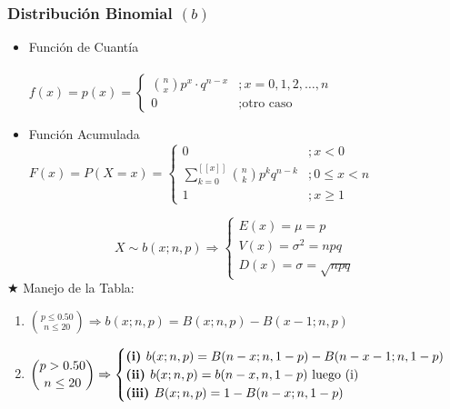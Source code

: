 \documentclass[10pt,letterpaper]{article}
\begin{document}
\subsubsection{Distribución Binomial $(b)$}
\begin{multicols}{2}
\begin{itemize}
\item Función de Cuantía \\ \vspace{0.025cm} \\
$f(x)=p(x)=
\begin{cases}
\binom{n}{x} p^x \cdot q^{n-x} &; x=0,1,2,\ldots ,n \\
0 &; \text{otro caso}
\end{cases}$
\end{itemize}
\columnbreak
\begin{itemize}
\item Función Acumulada \\
$F(x)=P(X=x)=
\begin{cases}
0 &; x<0 \\
\displaystyle\sum_{k=0}^{[\![ x ]\!]} \binom{n}{k}p^k q^{n-k} &; 0 \leq x <n \\
1 &; x\geq 1
\end{cases}$
\end{itemize}
\end{multicols}
$$
X\sim b(x;n,p)\Rightarrow 
\begin{cases}
E(x)=\mu = p \\
V(x)=\sigma^2 = npq\\
D(x)=\sigma=\sqrt{npq}
\end{cases}
$$
$\bigstar$ Manejo de la Tabla:
\begin{enumerate}
\item $\displaystyle\binom{p\leq 0.50}{n\leq 20} \Rightarrow b(x;n,p) = B(x;n,p)-B(x-1;n,p)$
\item $\displaystyle\binom{p> 0.50}{n\leq 20}\Rightarrow
\begin{cases}
\text{\textbf{(i) }} b(x;n,p) = B(n-x;n,1-p)-B(n-x-1;n,1-p) \\
\text{\textbf{(ii) }} b(x;n,p) = b(n-x,n,1-p) \text{ luego (i)}\\
\text{\textbf{(iii) }} B(x;n,p) = 1-B(n-x;n,1-p) 
\end{cases}$
\end{enumerate}
\end{document}
